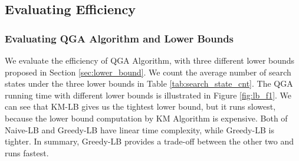
\subsection{Evaluating Efficiency} \label{sec:efficiency}

\subsubsection{Evaluating QGA Algorithm and Lower Bounds} \label{sec:evaluate_qga_bounds}
We evaluate the efficiency of QGA Algorithm, with three different lower bounds proposed in Section \ref{sec:lower_bound}. We count the average number of search states under the three lower bounds in Table \ref{tab:search_state_cnt}. The QGA running time with different lower bounds is illustrated in Figure \ref{fig:lb_f1}. We can see that KM-LB gives us the tightest lower bound, but it runs slowest, because the lower bound computation by KM Algorithm is expensive. Both of Naive-LB and Greedy-LB have linear time complexity, while Greedy-LB is tighter. In summary, Greedy-LB provides a trade-off between the other two and runs fastest.

